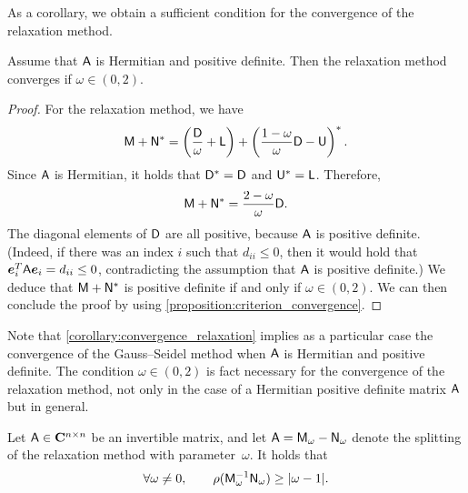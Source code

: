 As a corollary,
we obtain a sufficient condition for the convergence of the relaxation method.
\begin{corollary}
    \label{corollary:convergence_relaxation}
    Assume that $\mathsf A$ is Hermitian and positive definite.
    Then the relaxation method converges if $\omega \in (0, 2)$.
\end{corollary}
\begin{proof}
    For the relaxation method,
    we have
    \[
        \mathsf M + \mathsf N^*
        = \left( \frac{\mathsf D}{\omega} + \mathsf L \right) + \left(\frac{1 - \omega}{\omega} \mathsf D - \mathsf U \right)^*.
    \]
    Since $\mathsf A$ is Hermitian,
    it holds that $\mathsf D^* = \mathsf D$ and $\mathsf U^* = \mathsf L$.
    Therefore,
    \[
        \mathsf M + \mathsf N^*
        = \frac{2 - \omega}{\omega} \mathsf D.
    \]
    The diagonal elements of $\mathsf D$ are all positive,
    because $\mathsf A$ is positive definite.
    (Indeed, if there was an index $i$ such that $d_{ii} \leq 0$,
    then it would hold that $\mathbf{\boldsymbol{e}}_i^T \mathsf A \mathbf{\boldsymbol{e}}_i = d_{ii} \leq 0$,
    contradicting the assumption that $\mathsf A$ is positive definite.)
    We deduce that $\mathsf M + \mathsf N^*$ is positive definite if and only if $\omega \in (0, 2)$.
    We can then conclude the proof by using \cref{proposition:criterion_convergence}.
\end{proof}
Note that \cref{corollary:convergence_relaxation} implies as a particular case
the convergence of the Gauss--Seidel method when $\mathsf A$ is Hermitian and positive definite.
The condition $\omega \in (0, 2)$ is fact necessary for the convergence of the relaxation method,
not only in the case of a Hermitian positive definite matrix $\mathsf A$ but in general.
\begin{proposition}
    Let $\mathsf A \in \mathbf C^{n \times n}$ be an invertible matrix,
    and let $\mathsf A = \mathsf M_{\omega} - \mathsf N_{\omega}$ denote the splitting of the relaxation method with parameter~$\omega$.
    It holds that
    \[
        \forall \omega \neq 0, \qquad
        \rho(\mathsf M_{\omega}^{-1} \mathsf N_{\omega})
        \geq \lvert\omega - 1\rvert.
    \]
\end{proposition}
